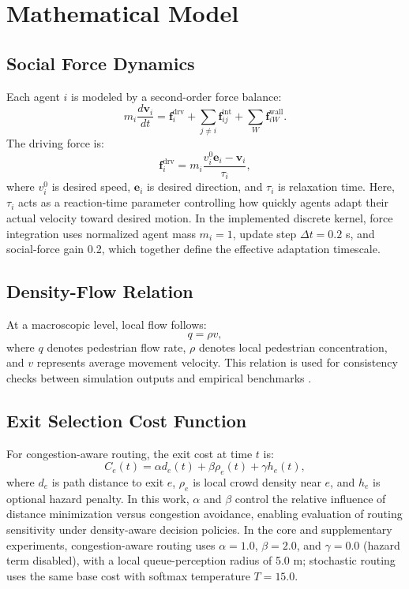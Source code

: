 \documentclass[journal]{IEEEtran}
\begin{document}
\section{Mathematical Model}
\subsection{Social Force Dynamics}
Each agent $i$ is modeled by a second-order force balance:
\begin{equation}
    m_i \frac{d\mathbf{v}_i}{dt} = \mathbf{f}_i^{\mathrm{drv}} + \sum_{j\neq i}\mathbf{f}_{ij}^{\mathrm{int}} + \sum_{W}\mathbf{f}_{iW}^{\mathrm{wall}}.
    \label{eq:sfm_full}
\end{equation}
The driving force is:
\begin{equation}
    \mathbf{f}_i^{\mathrm{drv}} = m_i\frac{v_i^0\mathbf{e}_i-\mathbf{v}_i}{\tau_i},
\end{equation}
where $v_i^0$ is desired speed, $\mathbf{e}_i$ is desired direction, and $\tau_i$ is relaxation time.
Here, $\tau_i$ acts as a reaction-time parameter controlling how quickly agents adapt their actual velocity toward desired motion.
In the implemented discrete kernel, force integration uses normalized agent mass $m_i=1$, update step $\Delta t=0.2$ s, and social-force gain 0.2, which together define the effective adaptation timescale.

\subsection{Density-Flow Relation}
At a macroscopic level, local flow follows:
\begin{equation}
    q = \rho v,
    \label{eq:qrv}
\end{equation}
where $q$ denotes pedestrian flow rate, $\rho$ denotes local pedestrian concentration, and $v$ represents average movement velocity. This relation is used for consistency checks between simulation outputs and empirical benchmarks \cite{fruin,weidmann1993}.

\subsection{Exit Selection Cost Function}
For congestion-aware routing, the exit cost at time $t$ is:
\begin{equation}
    C_e(t)=\alpha d_e(t)+\beta \rho_e(t)+\gamma h_e(t),
    \label{eq:cost}
\end{equation}
where $d_e$ is path distance to exit $e$, $\rho_e$ is local crowd density near $e$, and $h_e$ is optional hazard penalty. In this work, $\alpha$ and $\beta$ control the relative influence of distance minimization versus congestion avoidance, enabling evaluation of routing sensitivity under density-aware decision policies. In the core and supplementary experiments, congestion-aware routing uses $\alpha=1.0$, $\beta=2.0$, and $\gamma=0.0$ (hazard term disabled), with a local queue-perception radius of 5.0 m; stochastic routing uses the same base cost with softmax temperature $T=15.0$.
\end{document}
